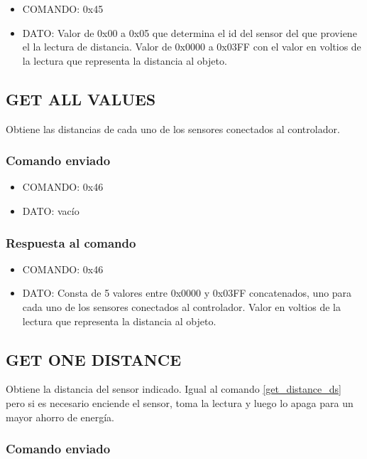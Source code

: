 \documentclass[a4paper,10pt]{article}
\begin{document}
\begin{itemize}
	\item{COMANDO:} 0x45
	\item{DATO:} Valor de 0x00 a 0x05 que determina el id del sensor del que proviene el la lectura de distancia.
	Valor de 0x0000 a 0x03FF con el valor en voltios de la lectura que representa la distancia al objeto.
\end{itemize}

\subsection{GET ALL VALUES}
\label{get_all_values_ds}

Obtiene las distancias de cada uno de los sensores conectados al controlador.

\subsubsection*{Comando enviado}

\begin{itemize}
	\item{COMANDO:} 0x46
	\item{DATO:} vac\'io
\end{itemize}

\subsubsection*{Respuesta al comando}

\begin{itemize}
	\item{COMANDO:} 0x46
	\item{DATO:} Consta de 5 valores entre 0x0000 y 0x03FF concatenados, uno para cada uno de los sensores conectados al controlador.
	Valor en voltios de la lectura que representa la distancia al objeto.
\end{itemize}

\subsection{GET ONE DISTANCE}
\label{get_one_distance_ds}

Obtiene la distancia del sensor indicado.
Igual al comando \ref{get_distance_ds} pero si es necesario enciende el sensor, toma la lectura y luego lo apaga para un mayor ahorro de energ\'ia.

\subsubsection*{Comando enviado}
\end{document}
